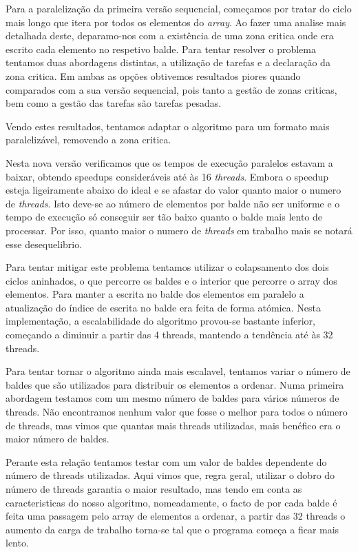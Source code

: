 \documentclass[a4paper]{report}
\begin{document}
Para a paralelização da primeira versão sequencial, começamos por tratar do
ciclo mais longo que itera por todos os elementos do \textit{array}. Ao fazer
uma analise mais detalhada deste, deparamo-nos com a existência de uma zona
critica onde era escrito cada elemento no respetivo balde. Para tentar resolver
o problema tentamos duas abordagens distintas, a utilização de tarefas e a
declaração da zona critica. Em ambas as opções obtivemos resultados piores
quando comparados com a sua versão sequencial, pois tanto a gestão de zonas
criticas, bem como a gestão das tarefas são tarefas pesadas.

Vendo estes resultados, tentamos adaptar o algoritmo para um formato mais
paralelizável, removendo a zona critica.

Nesta nova versão verificamos que os tempos de execução paralelos estavam a
baixar, obtendo speedups consideráveis até às 16 \textit{threads}. Embora o
speedup esteja ligeiramente abaixo do ideal e se afastar do valor quanto maior o
numero de \textit{threads}. Isto deve-se ao número de elementos por balde não
ser uniforme e o tempo de execução só conseguir ser tão baixo quanto o balde
mais lento de processar. Por isso, quanto maior o numero de \textit{threads} em
trabalho mais se notará esse desequelibrio.

Para tentar mitigar este problema tentamos utilizar o colapsamento dos dois
ciclos aninhados, o que percorre os baldes e o interior que percorre o array dos
elementos. Para manter a escrita no balde dos elementos em paralelo a
atualização do índice de escrita no balde era feita de forma atómica. Nesta
implementação, a escalabilidade do algoritmo provou-se bastante inferior,
começando a diminuir a partir das 4 threads, mantendo a tendência até às 32
threads.

Para tentar tornar o algoritmo ainda mais escalavel, tentamos variar o número de
baldes que são utilizados para distribuir os elementos a ordenar. Numa primeira
abordagem testamos com um mesmo número de baldes para vários números de threads.
Não encontramos nenhum valor que fosse o melhor para todos o número de threads,
mas vimos que quantas mais threads utilizadas, mais benéfico era o maior número
de baldes. 

Perante esta relação tentamos testar com um valor de baldes dependente do número
de threads utilizadas. Aqui vimos que, regra geral, utilizar o dobro do número
de threads garantia o maior resultado, mas tendo em conta as caracteristicas do
nosso algoritmo, nomeadamente, o facto de por cada balde é feita uma passagem
pelo array de elementos a ordenar, a partir das 32 threads o aumento da carga de
trabalho torna-se tal que o programa começa a ficar mais lento.
\end{document}
